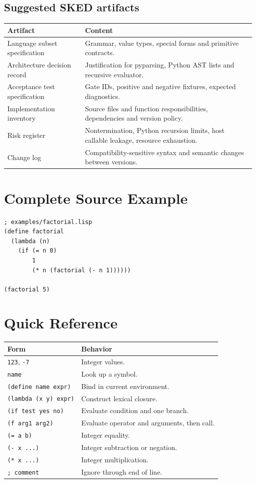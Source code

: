 \documentclass[11pt,a4paper,oneside]{report}
\begin{document}
\section{Suggested SKED artifacts}
\begin{longtable}{p{}p{}}\toprule Artifact & Content\\\midrule\endhead
Language subset specification & Grammar, value types, special forms and primitive contracts.\\
Architecture decision record & Justification for pyparsing, Python AST lists and recursive evaluator.\\
Acceptance test specification & Gate IDs, positive and negative fixtures, expected diagnostics.\\
Implementation inventory & Source files and function responsibilities, dependencies and version policy.\\
Risk register & Nontermination, Python recursion limits, host callable leakage, resource exhaustion.\\
Change log & Compatibility-sensitive syntax and semantic changes between versions.\\\bottomrule
\end{longtable}

\appendix
\chapter{Complete Source Example}
\begin{lstlisting}
; examples/factorial.lisp
(define factorial
  (lambda (n)
    (if (= n 0)
        1
        (* n (factorial (- n 1))))))

(factorial 5)
\end{lstlisting}
\chapter{Quick Reference}
\begin{longtable}{p{}p{}}\toprule Form & Behavior\\\midrule\endhead
\texttt{123}, \texttt{-7} & Integer values.\\
\texttt{name} & Look up a symbol.\\
\texttt{(define name expr)} & Bind in current environment.\\
\texttt{(lambda (x y) expr)} & Construct lexical closure.\\
\texttt{(if test yes no)} & Evaluate condition and one branch.\\
\texttt{(f arg1 arg2)} & Evaluate operator and arguments, then call.\\
\texttt{(= a b)} & Integer equality.\\
\texttt{(- x ...)} & Integer subtraction or negation.\\
\texttt{(* x ...)} & Integer multiplication.\\
\texttt{; comment} & Ignore through end of line.\\\bottomrule
\end{longtable}
\end{document}
